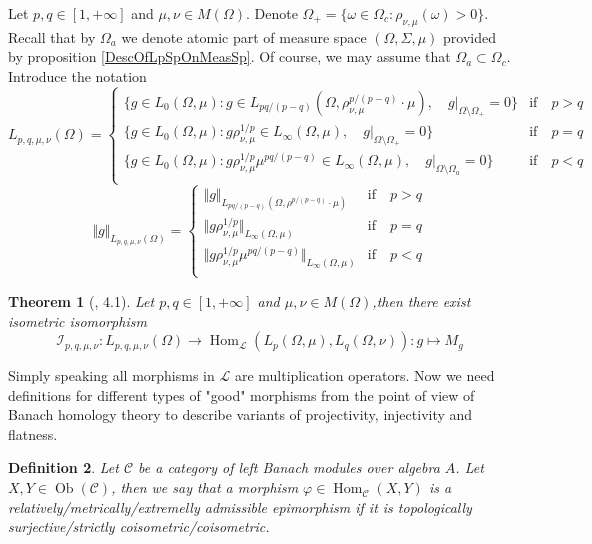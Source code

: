 \documentclass[12pt]{article}
\newtheorem{theorem}{Theorem}[subsection]
\newtheorem{definition}[theorem]{Definition}
\begin{document}
Let $p,q\in[1,+\infty]$ and $\mu,\nu\in M(\Omega)$. Denote $\Omega_+=\{\omega\in\Omega_c:\rho_{\nu,\mu}(\omega)>0\}$. Recall that by $\Omega_a$ we denote atomic part of measure space $(\Omega,\Sigma,\mu)$ provided by proposition \ref{DescOfLpSpOnMeasSp}. Of course, we may assume that $\Omega_a\subset\Omega_c$. Introduce the notation
$$
L_{p,q,\mu,\nu}(\Omega)=
\begin{cases}
\{g\in L_0(\Omega,\mu):g\in L_{pq/(p-q)}(\Omega,\rho_{\nu,\mu}^{p/(p-q)}\cdot\mu),\quad g|_{\Omega\setminus\Omega_+}=0\}&\text{if}\quad p>q\\
\{g\in L_0(\Omega,\mu):g\rho_{\nu,\mu}^{1/p}\in L_{\infty}(\Omega,\mu),\quad g|_{\Omega\setminus\Omega_+}=0\}&\text{if}\quad p=q\\
\{g\in L_0(\Omega,\mu):g\rho_{\nu,\mu}^{1/p}\mu^{pq/(p-q)}\in L_{\infty}(\Omega,\mu),\quad g|_{\Omega\setminus\Omega_a}=0\}&\text{if}\quad p<q\\
\end{cases}
$$
$$
\Vert g\Vert_{L_{p,q,\mu,\nu}(\Omega)}=
\begin{cases}
\Vert g\Vert_{L_{pq/(p-q)}(\Omega,\rho^{p/(p-q)}\cdot\mu)}&\text{if}\quad p>q\\
\Vert g\rho_{\nu,\mu}^{1/p}\Vert_{L_{\infty}(\Omega,\mu)}&\text{if}\quad p=q\\
\Vert g\rho_{\nu,\mu}^{1/p}\mu^{pq/(p-q)}\Vert_{L_{\infty}(\Omega,\mu)}&\text{if}\quad p<q\\
\end{cases}
$$
\begin{theorem}[\cite{HelTensProdAndMultModLp}, 4.1]\label{LpModMorphCharac}
Let $p,q\in[1,+\infty]$ and $\mu,\nu\in M(\Omega)$,then there exist isometric isomorphism
$$
\mathcal{I}_{p,q,\mu,\nu}:L_{p,q,\mu,\nu}(\Omega)\to\operatorname{Hom}_{\mathscr{L}}(L_p(\Omega,\mu),L_q(\Omega,\nu)):g\mapsto M_g
$$
\end{theorem}

Simply speaking all morphisms in $\mathscr{L}$ are multiplication operators. Now we need definitions for different types of "good" morphisms from the point of view of Banach homology theory to describe variants of projectivity, injectivity and flatness.

\begin{definition}\label{AdmEpiMorph} Let $\mathscr{C}$ be a category of left Banach modules over algebra $A$. Let $X,Y\in\operatorname{Ob}(\mathscr{C})$, then we say that a morphism $\varphi\in\operatorname{Hom}_{\mathscr{C}}(X,Y)$ is a relatively/metrically/extremelly admissible epimorphism if it is topologically surjective/strictly coisometric/coisometric.
\end{definition}
\end{document}
